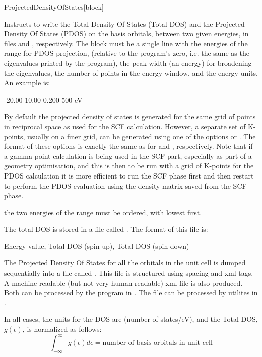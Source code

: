 \begin{fdfentry}{ProjectedDensityOfStates}[block]

  Instructs to write the Total Density Of States (Total DOS) and the
  Projected Density Of States (PDOS) on the basis orbitals, between
  two given energies, in files  and ,
  respectively.  The block must be a single line with the energies of
  the range for PDOS projection, (relative to the program's zero,
  i.e. the same as the eigenvalues printed by the program), the peak
  width (an energy) for broadening the eigenvalues, the number of
  points in the energy window, and the energy units.  An example is:
  \begin{fdfexample}
        -20.00  10.00  0.200  500  eV
  \end{fdfexample}

  By default the projected density of states is generated for the same
  grid of points in reciprocal space as used for the SCF calculation.
  However, a separate set of K-points, usually on a finer grid, can be
  generated using one of the options  or
  . The format of these options is
  exactly the same as for  and
  , respectively. Note that if a gamma
  point calculation is being used in the SCF part, especially as part
  of a geometry optimisation, and this is then to be run with a grid
  of K-points for the PDOS calculation it is more efficient to run the
  SCF phase first and then restart to perform the PDOS evaluation
  using the density matrix saved from the SCF phase.

  \note the two energies of the range must be ordered, with lowest
  first.

  The total DOS is stored in a file called .  The format
  of this file is:
  \begin{shellexample}
   Energy value, Total DOS (spin up), Total DOS (spin down)
  \end{shellexample}

  The Projected Density Of States for all the orbitals in the unit
  cell is dumped sequentially into a file called
  . This file is structured using spacing and
  xml tags. A machine-readable (but not very human readable) xml file
   is also produced. Both can be processed by the
  program in . The  file can be
  processed by utilites in .

  In all cases, the units for the DOS are (number of states/eV), and the
  Total DOS, $g(\epsilon)$, is normalized as follows:
  \begin{equation}
    \int_{-\infty}^\infty g (\epsilon) d\epsilon =
    \text{number of basis orbitals in unit cell}
  \end{equation}

\end{fdfentry}



